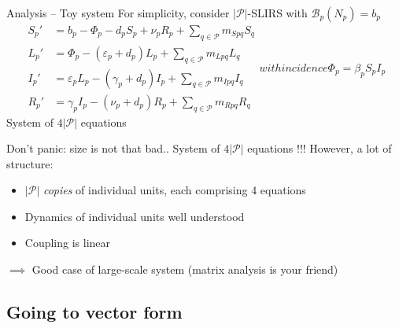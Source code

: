 \documentclass[aspectratio=169]{beamer}\usepackage[]{graphicx}\usepackage[]{xcolor}
\begin{document}
\begin{frame}{Analysis -- Toy system}
For simplicity, consider $|\mathcal{P}|$-SLIRS with $\mathcal{B}_p(N_p)=b_p$
\begin{subequations}
	\label{sys:pSLIRS_toy}
	\begin{align}
		S_{p}' &=b_p-\Phi_p-d_pS_p+\nu_pR_p
		+\textstyle{\sum_{q\in\mathcal{P}}} m_{Spq}S_{q} 
		\label{sys:pSLIRS_toy_dS} \\
		L_{p}' &=\Phi_p-\left( \varepsilon_{p}+d_{p}\right)L_{p}
		+\textstyle{\sum_{q\in\mathcal{P}}} m_{Lpq}L_{q} 
		\label{sys:pSLIRS_toy_dL} \\
		I_{p}' &=\varepsilon_pL_p-(\gamma_p+d_p)I_p
		+\textstyle{\sum_{q\in\mathcal{P}}} m_{Ipq}I_{q} 
		\label{sys:pSLIRS_toy_dI} \\
		R_{p}' &=\gamma _{p}I_{p}-\left(\nu_{p}+d_{p}\right)R_{p}
		+\textstyle{\sum_{q\in\mathcal{P}}} m_{Rpq}R_{q}
		\label{sys:pSLIRS_toy_dR} 
	\end{align}
	with incidence
	\begin{equation}
		\Phi_p=\beta_pS_pI_p
		\label{sys:pSLIRS_toy_incidence} 
	\end{equation}			
\end{subequations}
\vfill
System of $4|\mathcal{P}|$ equations
\end{frame}

\begin{frame}{Don't panic: size is not that bad..}
System of $4|\mathcal{P}|$ equations !!!
\vfill
However, a lot of structure: 
\begin{itemize}
	\item $|\mathcal{P}|$ \emph{copies} of individual units, each comprising 4 equations
	\item Dynamics of individual units well understood
	\item Coupling is linear
\end{itemize}
\vfill
$\implies$ Good case of large-scale system
\vfill
(matrix analysis is your friend)

\end{frame}




\subsection{Going to vector form}
\end{document}
